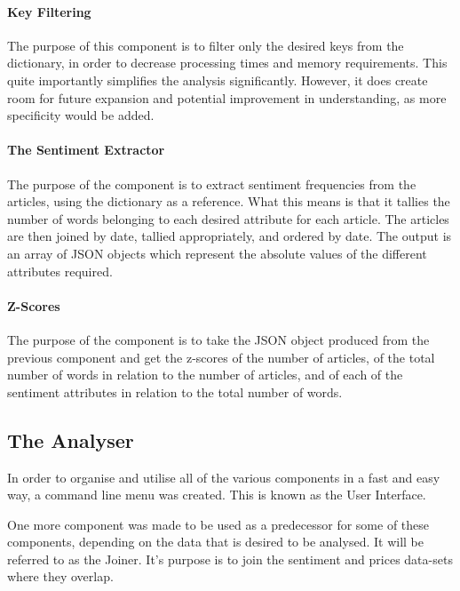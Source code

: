 \paragraph{Key Filtering}

The purpose of this component is to filter only the desired keys from the dictionary, in order to decrease processing times and memory requirements. This quite importantly simplifies the analysis significantly. However, it does create room for future expansion and potential improvement in understanding, as more specificity would be added.

\paragraph{The Sentiment Extractor}

The purpose of the component is to extract sentiment frequencies from the articles, using the dictionary as a reference. What this means is that it tallies the number of words belonging to each desired attribute for each article. The articles are then joined by date, tallied appropriately, and ordered by date. The output is an array of JSON objects which represent the absolute values of the different attributes required.

\paragraph{Z-Scores}

The purpose of the component is to take the JSON object produced from the previous component and get the z-scores of the number of articles, of the total number of words in relation to the number of articles, and of each of the sentiment attributes in relation to the total number of words.

\subsection{The Analyser}

In order to organise and utilise all of the various components in a fast and easy way, a command line menu was created. This is known as the User Interface.

One more component was made to be used as a predecessor for some of these components, depending on the data that is desired to be analysed. It will be referred to as the Joiner. It's purpose is to join the sentiment and prices data-sets where they overlap.

